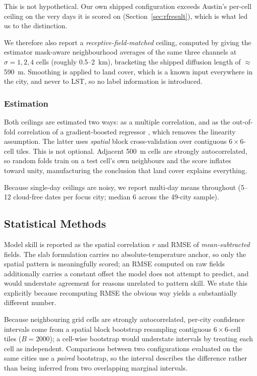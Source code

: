 \documentclass[remotesensing,article,submit,oneauthor]{Definitions/mdpi}
\begin{document}
This is not hypothetical. Our own shipped configuration exceeds Austin's
per-cell ceiling on the very days it is scored on
(Section~\ref{sec:rfresult}), which is what led us to the distinction.

We therefore also report a \emph{receptive-field-matched} ceiling,
computed by giving the estimator mask-aware neighbourhood averages of the
same three channels at $\sigma = 1, 2, 4$ cells (roughly 0.5--2~km),
bracketing the shipped diffusion length of $\approx$590~m. Smoothing is
applied to land cover, which is a known input everywhere in the city, and
never to LST, so no label information is introduced.

\subsubsection{Estimation}

Both ceilings are estimated two ways: as a multiple correlation, and as
the out-of-fold correlation of a gradient-boosted regressor
\cite{friedman2001greedy}, which removes the linearity assumption. The
latter uses \emph{spatial} block cross-validation over contiguous
$6 \times 6$-cell tiles. This is not optional. Adjacent 500~m cells are
strongly autocorrelated, so random folds train on a test cell's own
neighbours and the score inflates toward unity, manufacturing the
conclusion that land cover explains everything.

Because single-day ceilings are noisy, we report multi-day means
throughout (5--12 cloud-free dates per focus city; median 6 across the
49-city sample).

\subsection{Statistical Methods}

Model skill is reported as the spatial correlation $r$ and RMSE of
\emph{mean-subtracted} fields. The slab formulation carries no
absolute-temperature anchor, so only the spatial pattern is meaningfully
scored; an RMSE computed on raw fields additionally carries a constant
offset the model does not attempt to predict, and would understate
agreement for reasons unrelated to pattern skill. We state this
explicitly because recomputing RMSE the obvious way yields a substantially
different number.

Because neighbouring grid cells are strongly autocorrelated, per-city
confidence intervals come from a spatial block bootstrap resampling
contiguous $6 \times 6$-cell tiles ($B = 2000$); a cell-wise bootstrap
would understate intervals by treating each cell as independent.
Comparisons between two configurations evaluated on the same cities use a
\emph{paired} bootstrap, so the interval describes the difference rather
than being inferred from two overlapping marginal intervals.
\end{document}
